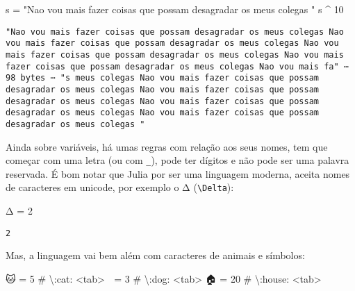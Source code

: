 \documentclass[
  letterpaper,
  DIV=11,
  numbers=noendperiod]{scrreprt}
\newenvironment{Shaded}{\begin{snugshade}}{\end{snugshade}}
\newcommand{\CommentTok}[1]{\textcolor[rgb]{0.37,0.37,0.37}{#1}}
\newcommand{\FloatTok}[1]{\textcolor[rgb]{0.68,0.00,0.00}{#1}}
\newcommand{\NormalTok}[1]{\textcolor[rgb]{0.00,0.23,0.31}{#1}}
\newcommand{\OperatorTok}[1]{\textcolor[rgb]{0.37,0.37,0.37}{#1}}
\newcommand{\StringTok}[1]{\textcolor[rgb]{0.13,0.47,0.30}{#1}}
\begin{document}
\begin{Shaded}
\begin{Highlighting}[]
\NormalTok{s }\OperatorTok{=} \StringTok{"Nao vou mais fazer coisas que possam desagradar os meus colegas "}
\NormalTok{s }\OperatorTok{\^{}} \FloatTok{10}
\end{Highlighting}
\end{Shaded}

\begin{verbatim}
"Nao vou mais fazer coisas que possam desagradar os meus colegas Nao vou mais fazer coisas que possam desagradar os meus colegas Nao vou mais fazer coisas que possam desagradar os meus colegas Nao vou mais fazer coisas que possam desagradar os meus colegas Nao vou mais fa" ⋯ 98 bytes ⋯ "s meus colegas Nao vou mais fazer coisas que possam desagradar os meus colegas Nao vou mais fazer coisas que possam desagradar os meus colegas Nao vou mais fazer coisas que possam desagradar os meus colegas Nao vou mais fazer coisas que possam desagradar os meus colegas "
\end{verbatim}

Ainda sobre variáveis, há umas regras com relação aos seus nomes, tem
que começar com uma letra (ou com \texttt{\_}), pode ter dígitos e não
pode ser uma palavra reservada. É bom notar que Julia por ser uma
linguagem moderna, aceita nomes de caracteres em unicode, por exemplo o
Δ (\texttt{\textbackslash{}Delta}):

\begin{Shaded}
\begin{Highlighting}[]
\NormalTok{Δ }\OperatorTok{=} \FloatTok{2}
\end{Highlighting}
\end{Shaded}

\begin{verbatim}
2
\end{verbatim}

Mas, a linguagem vai bem além com caracteres de animais e símbolos:

\begin{Shaded}
\begin{Highlighting}[]
\NormalTok{🐱 }\OperatorTok{=} \FloatTok{5} \CommentTok{\# \textbackslash{}:cat: \textless{}tab\textgreater{}}
\NormalTok{🐶 }\OperatorTok{=} \FloatTok{3} \CommentTok{\# \textbackslash{}:dog: \textless{}tab\textgreater{}}
\NormalTok{🏠 }\OperatorTok{=} \FloatTok{20} \CommentTok{\# \textbackslash{}:house: \textless{}tab\textgreater{}}
\end{Highlighting}
\end{Shaded}
\end{document}
